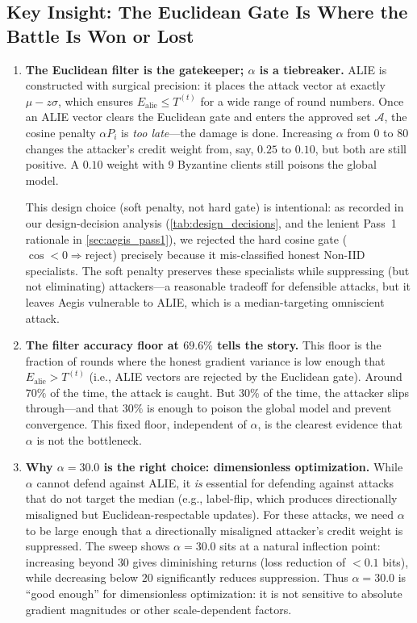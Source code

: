 \documentclass[../main]{subfiles}
\begin{document}
\subsection{Key Insight: The Euclidean Gate Is Where the Battle Is Won or Lost}
\label{app:alpha_sweep_obs}

\begin{enumerate}
    \item \textbf{The Euclidean filter is the gatekeeper; $\alpha$ is a tiebreaker.}
    ALIE is constructed with surgical precision: it places the attack vector at exactly $\mu - z\sigma$,
    which ensures $E_{\text{alie}} \leq T^{(t)}$ for a wide range of round numbers.
    Once an ALIE vector clears the Euclidean gate and enters the approved set $\mathcal{A}$,
    the cosine penalty $\alpha P_i$ is \emph{too late}---the damage is done.
    Increasing $\alpha$ from $0$ to $80$ changes the attacker's credit weight from, say, $0.25$ to $0.10$,
    but both are still positive. A $0.10$ weight with 9 Byzantine clients still poisons the global model.

    This design choice (soft penalty, not hard gate) is intentional: as recorded in our
    design-decision analysis (\cref{tab:design_decisions}, and the lenient Pass~1 rationale in
    \cref{sec:aegis_pass1}), we rejected the hard cosine gate ($\cos < 0 \Rightarrow \text{reject}$)
    precisely because it mis-classified honest Non-IID specialists. The soft penalty preserves these specialists while
    suppressing (but not eliminating) attackers---a reasonable tradeoff for defensible attacks,
    but it leaves Aegis vulnerable to ALIE, which is a median-targeting omniscient attack.

    \item \textbf{The filter accuracy floor at $69.6\%$ tells the story.}
    This floor is the fraction of rounds where the honest gradient variance is low enough that
    $E_{\text{alie}} > T^{(t)}$ (i.e., ALIE vectors are rejected by the Euclidean gate).
    Around $70\%$ of the time, the attack is caught. But $30\%$ of the time, the attacker slips through---and
    that $30\%$ is enough to poison the global model and prevent convergence.
    This fixed floor, independent of $\alpha$, is the clearest evidence that $\alpha$ is not the bottleneck.

    \item \textbf{Why $\alpha = 30.0$ is the right choice: dimensionless optimization.}
    While $\alpha$ cannot defend against ALIE, it \emph{is} essential for defending against
    attacks that do not target the median (e.g., label-flip, which produces directionally misaligned
    but Euclidean-respectable updates). For these attacks, we need $\alpha$ to be large enough that
    a directionally misaligned attacker's credit weight is suppressed.
    The sweep shows $\alpha = 30.0$ sits at a natural inflection point: increasing beyond $30$ gives
    diminishing returns (loss reduction of $<0.1$ bits), while decreasing below $20$ significantly
    reduces suppression. Thus $\alpha = 30.0$ is ``good enough'' for dimensionless optimization:
    it is not sensitive to absolute gradient magnitudes or other scale-dependent factors.
\end{enumerate}
\end{document}
